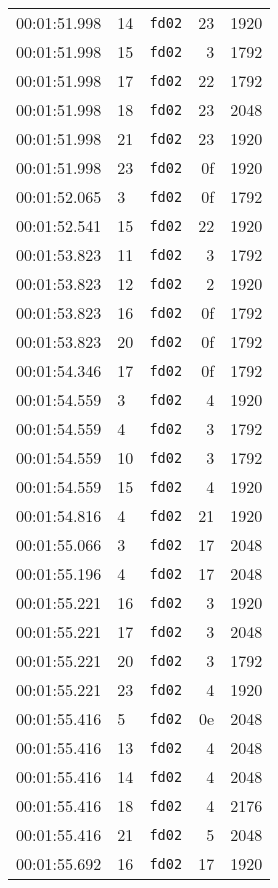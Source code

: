 \documentclass{article}
\begin{document}
\begin{longtable}{lllrr}
00:01:51.998 & 14 & \texttt{fd02} & 23 & 1920 \\
00:01:51.998 & 15 & \texttt{fd02} & 3 & 1792 \\
00:01:51.998 & 17 & \texttt{fd02} & 22 & 1792 \\
00:01:51.998 & 18 & \texttt{fd02} & 23 & 2048 \\
00:01:51.998 & 21 & \texttt{fd02} & 23 & 1920 \\
00:01:51.998 & 23 & \texttt{fd02} & 0f & 1920 \\
00:01:52.065 & 3 & \texttt{fd02} & 0f & 1792 \\
00:01:52.541 & 15 & \texttt{fd02} & 22 & 1920 \\
00:01:53.823 & 11 & \texttt{fd02} & 3 & 1792 \\
00:01:53.823 & 12 & \texttt{fd02} & 2 & 1920 \\
00:01:53.823 & 16 & \texttt{fd02} & 0f & 1792 \\
00:01:53.823 & 20 & \texttt{fd02} & 0f & 1792 \\
00:01:54.346 & 17 & \texttt{fd02} & 0f & 1792 \\
00:01:54.559 & 3 & \texttt{fd02} & 4 & 1920 \\
00:01:54.559 & 4 & \texttt{fd02} & 3 & 1792 \\
00:01:54.559 & 10 & \texttt{fd02} & 3 & 1792 \\
00:01:54.559 & 15 & \texttt{fd02} & 4 & 1920 \\
00:01:54.816 & 4 & \texttt{fd02} & 21 & 1920 \\
00:01:55.066 & 3 & \texttt{fd02} & 17 & 2048 \\
00:01:55.196 & 4 & \texttt{fd02} & 17 & 2048 \\
00:01:55.221 & 16 & \texttt{fd02} & 3 & 1920 \\
00:01:55.221 & 17 & \texttt{fd02} & 3 & 2048 \\
00:01:55.221 & 20 & \texttt{fd02} & 3 & 1792 \\
00:01:55.221 & 23 & \texttt{fd02} & 4 & 1920 \\
00:01:55.416 & 5 & \texttt{fd02} & 0e & 2048 \\
00:01:55.416 & 13 & \texttt{fd02} & 4 & 2048 \\
00:01:55.416 & 14 & \texttt{fd02} & 4 & 2048 \\
00:01:55.416 & 18 & \texttt{fd02} & 4 & 2176 \\
00:01:55.416 & 21 & \texttt{fd02} & 5 & 2048 \\
00:01:55.692 & 16 & \texttt{fd02} & 17 & 1920 \\

\end{longtable}
\end{document}
